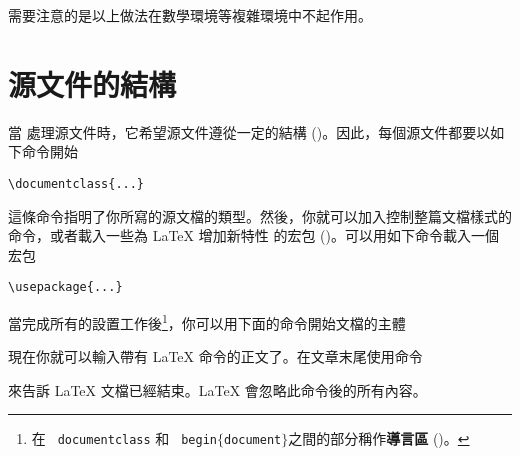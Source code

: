 需要注意的是以上做法在數學環境等複雜環境中不起作用。

\section{源文件的結構}\label{inputfilestructure}


當 \LaTeXe{} 處理源文件時，它希望源文件遵從一定的結構 ()。因此，每個源文件都要以如下命令開始
\begin{code}
\verb|\documentclass{...}|
\end{code}
這條命令指明了你所寫的源文檔的類型。然後，你就可以加入控制整篇文檔樣式的命令，或者載入一些為 \LaTeX{} 增加新特性
的宏包 ()。可以用如下命令載入一個宏包
\begin{code}
\verb|\usepackage{...}|
\end{code}


當完成所有的設置工作後\footnote{在 \texttt{\bs
    documentclass} 和 \texttt{\bs
    begin$\mathtt{\{}$document$\mathtt{\}}$}之間的部分稱作\textbf{導言區} ()。}，你可以用下面的命令開始文檔的主體
\begin{code}
\verb||
\end{code}


現在你就可以輸入帶有 \LaTeX{} 命令的正文了。在文章末尾使用命令
\begin{code}
\verb||
\end{code}
來告訴 \LaTeX{} 文檔已經結束。\LaTeX{} 會忽略此命令後的所有內容。

